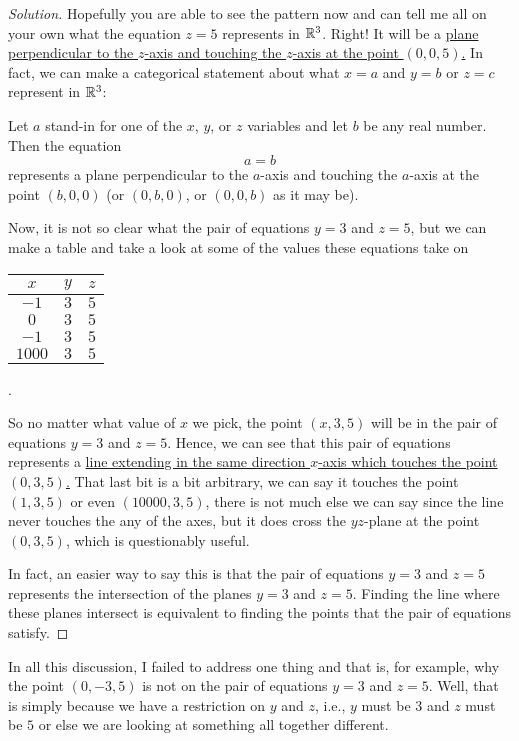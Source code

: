 \begin{proof}[Solution]
Hopefully you are able to see the pattern now and can tell me all on your
own what the equation $z=5$ represents in $\mathbb{R}^3$. Right! It will be a
\ul{plane perpendicular to the $z$-axis and touching the $z$-axis at the
  point $(0,0,5)$.} In fact, we can make a categorical statement about what
$x=a$ and $y=b$ or $z=c$ represent in $\mathbb{R}^3$:
\begin{definition}
Let $a$ stand-in for one of the $x$, $y$, or $z$ variables and let $b$ be
any real number. Then the equation
\begin{equation}
  \label{eq:plane}
  a=b
\end{equation}
represents a plane perpendicular to the $a$-axis and touching the $a$-axis
at the point $(b,0,0)$ (or $(0,b,0)$, or $(0,0,b)$ as it may be).
\end{definition}

Now, it is not so clear what the pair of equations $y=3$ and $z=5$, but we
can make a table and take a look at some of the values these equations take
on
\begin{center}
\begin{tabular}{|c|c|c|}
\hline
$x$&$y$&$z$\\
\hline
$-1$&$3$&$5$\\
$0$&$3$&$5$\\
$-1$&$3$&$5$\\
$1000$&$3$&$5$\\
\hline
\end{tabular}.
\end{center}
So no matter what value of $x$ we pick, the point $(x,3,5)$ will be in the
pair of equations $y=3$ and $z=5$. Hence, we can see that this pair of
equations represents a \ul{line extending in the same direction $x$-axis
  which touches the point $(0,3,5)$.} That last bit is a bit arbitrary, we
can say it touches the point $(1,3,5)$ or even $(10000,3,5)$, there is not
much else we can say since the line never touches the any of the axes, but
it does cross the $yz$-plane at the point $(0,3,5)$, which is questionably
useful.

In fact, an easier way to say this is that the pair of equations $y=3$ and
$z=5$ represents the intersection of the planes $y=3$ and $z=5$. Finding
the line where these planes intersect is equivalent to finding the points
that the pair of equations satisfy.
\end{proof}
\begin{remarks*}
In all this discussion, I failed to address one thing and that is, for
example, why the point $(0,-3,5)$ is not on the pair of equations $y=3$ and
$z=5$. Well, that is simply because we have a restriction on $y$ and $z$,
i.e., $y$ must be $3$ and $z$ must be $5$ or else we are looking at
something all together different.
\end{remarks*}

